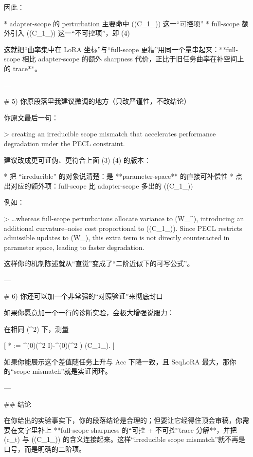 因此：

* adapter-scope 的 perturbation 主要命中 ((C_1\Pi_\Delta)) 这一“可控项”
* full-scope 额外引入 ((C_1\Pi_\perp)) 这一“不可控项”，即 (4)

这就把“曲率集中在 LoRA 坐标”与“full-scope 更糟”用同一个量串起来：**full-scope 相比 adapter-scope 的额外 sharpness 代价，正比于旧任务曲率在补空间上的 trace**。

---

# 5) 你原段落里我建议微调的地方（只改严谨性，不改结论）

你原文最后一句：

> creating an irreducible scope mismatch that accelerates performance degradation under the PECL constraint.

建议改成更可证伪、更符合上面 (3)-(4) 的版本：

* 把 “irreducible” 的对象说清楚：是 **parameter-space** 的直接可补偿性
* 点出对应的额外项：full-scope 比 adapter-scope 多出的 ((C_1\Pi_\perp))

例如：

> …whereas full-scope perturbations allocate variance to (\mathcal W_\Delta^\perp), introducing an additional curvature–noise cost proportional to ((C_1\Pi_\perp)). Since PECL restricts admissible updates to (\mathcal W_\Delta), this extra term is not directly counteracted in parameter space, leading to faster degradation.

这样你的机制陈述就从“直觉”变成了“二阶近似下的可写公式”。

---

# 6) 你还可以加一个非常强的“对照验证”来彻底封口

如果你愿意加一个一行的诊断实验，会极大增强说服力：

在相同 (\sigma^2) 下，测量

[
\Delta {}*{}
:=
^{(0)}(\sigma^2 I)-^{(0)}(\sigma^2 \Pi*\Delta)
\approx
{}(C_1\Pi_\perp).
]

如果你能展示这个差值随任务上升与 Acc 下降一致，且 SeqLoRA 最大，那你的“scope mismatch”就是实证闭环。

---

## 结论

在你给出的实验事实下，你的段落结论是合理的；但要让它经得住顶会审稿，你需要在文字里补上 **full-scope sharpness 的“可控 + 不可控”trace 分解**，并把 (c_t) 与 ((C_1\Pi_\perp)) 的含义连接起来。这样“irreducible scope mismatch”就不再是口号，而是明确的二阶项。
